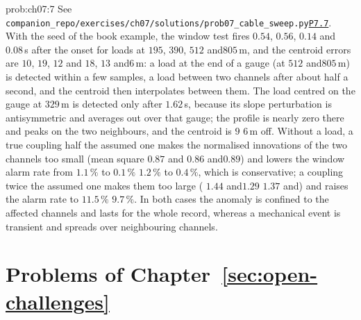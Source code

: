 \documentclass[graybox,envcountchap]{style/SNmono}
\newcommand{\repopath}[1]{\texttt{#1}}
\providecommand{\DIFadd}[1]{{\protect\color{blue} #1}} %
\providecommand{\DIFdel}[1]{{\protect\color{red} #1}} %
\providecommand{\DIFaddbegin}{} %
\providecommand{\DIFaddend}{} %
\providecommand{\DIFdelbegin}{} %
\providecommand{\DIFdelend}{} %
\DeclareRobustCommand{\RtwoDel}[1]{{\color{red}%
  \renewcommand{\DIFadd}[1]{##1}\renewcommand{\DIFdel}[1]{##1}%
  #1}}
\DeclareRobustCommand{\RtwoAdd}[1]{{\color{blue}#1}}
\DeclareRobustCommand{\codeentry}[1]{\hyperref[code:#1]{\texttt{#1}}}
\begin{document}
\begin{sol}{prob:ch07:7}
See \RtwoDel{\repopath{companion\_\allowbreak repo/\allowbreak exercises/\allowbreak ch07/\allowbreak solutions/\allowbreak prob07\_\allowbreak cable\_\allowbreak sweep.py}}\RtwoAdd{\codeentry{P7.7}}. With the seed of the book example, the window test fires  $0.54$, $0.56$, $0.14$ and\DIFdelbegin \DIFdel{$0.08$}\DIFdelend \DIFaddbegin \allowbreak \DIFadd{$0.06$}\DIFaddend \,s after the onset for loads at $195$, $390$, $512$ and\DIFaddbegin \allowbreak \DIFaddend $805$\,m, and the centroid errors are  $10$, \DIFdelbegin \DIFdel{$19$, $12$ and}\DIFdelend \DIFaddbegin \DIFadd{$18$, $13$ and}\allowbreak \DIFaddend $6$\,m: a load at the end of a gauge (at $512$ and\DIFaddbegin \allowbreak \DIFaddend $805$\,m) is detected within a few samples, a load between two channels after about half a second, and the centroid then interpolates between them. The load centred on the gauge at $329$\,m is detected only after $1.62$\,s, because its slope perturbation is antisymmetric and averages out over that gauge; the profile is nearly zero there and peaks on the two neighbours, and the centroid is \DIFdelbegin \DIFdel{$9$}\DIFdelend \DIFaddbegin \DIFadd{$6$}\DIFaddend \,m off. Without a load, a true coupling half the assumed one makes the normalised innovations of the two channels too small (mean square  \DIFdelbegin \DIFdel{$0.87$ and}\DIFdelend \DIFaddbegin \DIFadd{$0.86$ and}\allowbreak \DIFaddend $0.89$) and lowers the window alarm rate from \DIFdelbegin \DIFdel{$1.1\,\%$ to $0.1\,\%$}\DIFdelend \DIFaddbegin \DIFadd{$1.2\,\%$ to $0.4\,\%$}\DIFaddend , which is conservative; a coupling twice the assumed one makes them too large ( \DIFdelbegin \DIFdel{$1.44$ and$1.29$}\DIFdelend \DIFaddbegin \DIFadd{$1.37$ and}\allowbreak \DIFadd{$1.31$}\DIFaddend ) and raises the alarm rate to \DIFdelbegin \DIFdel{$11.5\,\%$}\DIFdelend \DIFaddbegin \DIFadd{$9.7\,\%$}\DIFaddend . In both cases the anomaly is confined to the affected channels and lasts for the whole record, whereas a mechanical event is transient and spreads over neighbouring channels.
\end{sol}


\section*{Problems of Chapter~\ref{sec:open-challenges}}
\end{document}
